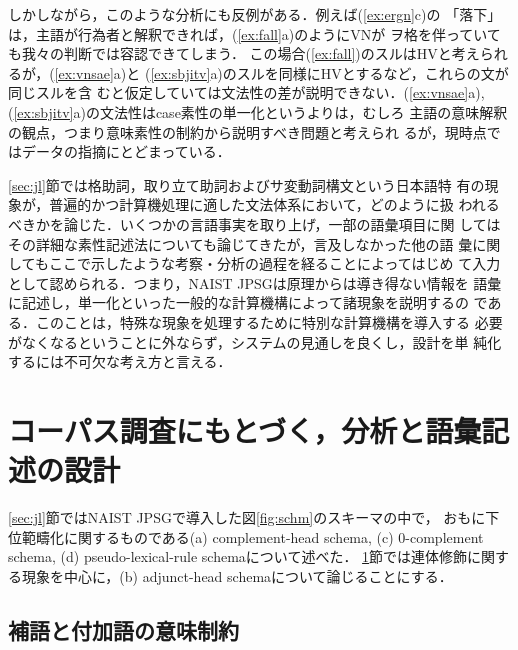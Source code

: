 しかしながら，このような分析にも反例がある．例えば(\ref{ex:ergn}c)の
「落下」は，主語が行為者と解釈できれば，(\ref{ex:fall}a)のようにVNが
ヲ格を伴っていても我々の判断では容認できてしまう．
この場合(\ref{ex:fall})のスルはHVと考えられるが，(\ref{ex:vnsae}a)と
(\ref{ex:sbjitv}a)のスルを同様にHVとするなど，これらの文が同じスルを含
むと仮定していては文法性の差が説明できない．(\ref{ex:vnsae}a),
(\ref{ex:sbjitv}a)の文法性は{\sc case}素性の単一化というよりは，むしろ
主語の意味解釈の観点，つまり意味素性の制約から説明すべき問題と考えられ
るが，現時点ではデータの指摘にとどまっている．

\ref{sec:jl}節では格助詞，取り立て助詞およびサ変動詞構文という日本語特
有の現象が，普遍的かつ計算機処理に適した文法体系において，どのように扱
われるべきかを論じた．いくつかの言語事実を取り上げ，一部の語彙項目に関
してはその詳細な素性記述法についても論じてきたが，言及しなかった他の語
彙に関してもここで示したような考察・分析の過程を経ることによってはじめ
て入力として認められる．つまり，NAIST JPSGは原理からは導き得ない情報を
語彙に記述し，単一化といった一般的な計算機構によって諸現象を説明するの
である．このことは，特殊な現象を処理するために特別な計算機構を導入する
必要がなくなるということに外ならず，システムの見通しを良くし，設計を単
純化するには不可欠な考え方と言える．

\setcounter{section}{3}

\section{コーパス調査にもとづく，分析と語彙記述の設計}\label{sec:adn}

\ref{sec:jl}節ではNAIST JPSGで導入した図\ref{fig:schm}のスキーマの中で，
おもに下位範疇化に関するものである(a) complement-head schema, (c)
0-complement schema, (d) pseudo-lexical-rule schemaについて述べた．
\ref{sec:adn}節では連体修飾に関する現象を中心に，(b) adjunct-head
schemaについて論じることにする．

\subsection{補語と付加語の意味制約}\label{sec:adn:cmpadj}

